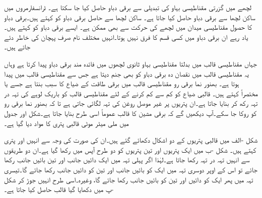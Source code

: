 لچھے میں گزرتی مقناطیسی بہاو کی تبدیلی سے  برقی دباو حاصل کیا جا سکتا ہے۔ ٹرانسفارمروں میں ساکن لچھا سے برقی دباو حاصل کیا جاتا ہے۔ ساکن لچھا سے حاصل برقی دباو کو   کہتے ہیں۔برقی دباو کا حصول مقناطیسی میدان میں لچھے کی حرکت سے بھی ممکن ہے۔ ایسے برقی دباو کو   کہتے ہیں۔یاد رہے ان برقی دباو میں کسی قسم کا فرق نہیں ہوتا۔انہیں مختلف نام صرف پہچان کی خاطر دئے جاتے ہیں۔

جہاں مقناطیسی قالب میں بدلتا مقناطیسی بہاو ثانوی لچھوں میں فائدہ مند برقی دباو پیدا کرتا ہے وہاں یہ مقناطیسی قالب میں نقصان دہ برقی دباو کو بھی جنم دیتا ہے جس سے مقناطیسی قالب میں  پیدا ہوتا ہے۔ بھنور نما برقی رو مقناطیسی قالب میں برقی طاقت کے ضیاع کا سبب بنتا ہے جسے   یا  مختصراً  کہتے ہیں۔ قالبی ضیاع کو کم سے کم کرنے کے لئے مقناطیسی قالب کو  باریک لوہے کی  تہہ در تہہ رکھ کر بنایا جاتا ہے۔ان پتریوں پر غیر موصل روغن کی تہہ لگائی جاتی ہے تا کہ بھنور نما برقی رو کو روکا جا سکے۔آپ دیکھیں گے کہ برقی مشین کا قالب عموماً اسی طرح بنایا جاتا ہے۔شکل  اور جدول   میں  ملی میٹر موٹی  قالبی پتری کا  مواد دیا گیا ہے۔

شکل -الف میں قالبی پتریوں کے دو اشکال دکھائے گئے ہیں۔ان کی صورت کی وجہ سے انہیں  اور   پتری کہتے ہیں۔ شکل -ب میں ایک پتریوں اور تین پتریوں   کو دو طرح آپس میں رکھا گیا ہے۔ان دو طریقوں سے انہیں تہہ در تہہ رکھا جاتا ہے۔لہٰذا اگر پہلی تہہ میں ایک دائیں جانب اور تین بائیں جانب رکھا جائے تو اس کے اوپر دوسری تہہ میں ایک کو بائیں جانب اور تین کو دائیں جانب رکھا جائے گا۔تیسری تہہ میں پھر ایک کو دائیں اور تین کو بائیں جانب رکھا جائے گا، وغیرہ۔اسی طرح انہیں جوڑ کر شکل -پ میں دکھایا گیا قالب حاصل کیا جاتا ہے۔

